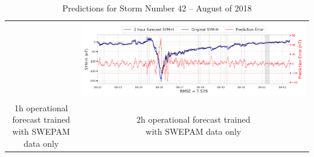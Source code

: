 \documentclass[draft,sw]{agutexSI2019}
\begin{document}
\begin{table}
\begin{tabular}{cc}
&
\includegraphics[width=0.49\linewidth]{paper_plots_shade/2h_swepam_rt/2h_swepam_rt_storm_42.png}
\\
\shortstack{1h operational forecast trained\\ with SWEPAM data only} & \shortstack{2h operational forecast trained\\ with SWEPAM data only}
\vspace*{12pt}
\\
\end{tabular}
\caption{Predictions for Storm Number 42 -- August of 2018}
\label{storm-42}
\end{table}
\end{document}
